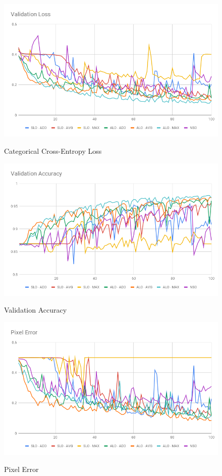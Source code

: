 \begin{figure}
  \caption{Categorical Cross-Entropy Loss}
  \centering
  \includegraphics[width=1.\columnwidth]{figures/falreis/validation_loss.png}\label{fig:validation_loss}
\end{figure}

\begin{figure}
  \caption{Validation Accuracy}
  \centering
  \includegraphics[width=1.\columnwidth]{figures/falreis/validation_accuracy.png}\label{fig:validation_accuracy}
\end{figure}

\begin{figure}
  \caption{Pixel Error}
  \centering
  \includegraphics[width=1.\columnwidth]{figures/falreis/pixel_error.png}\label{fig:pixel_error}
\end{figure}

